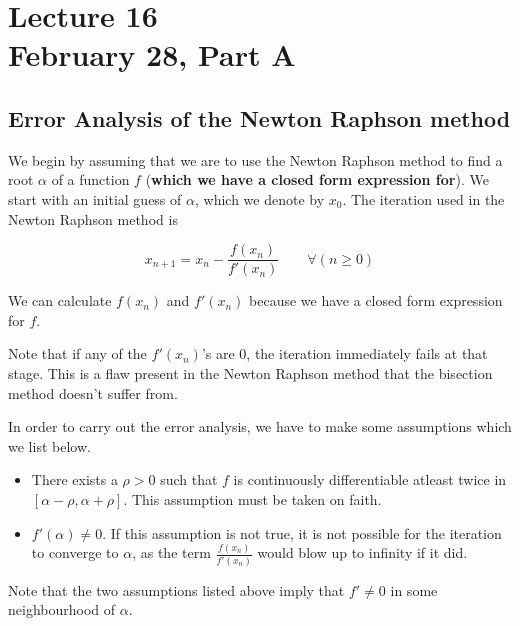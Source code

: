 \chapter*{Lecture 16 \\ February 28, Part A}
\setcounter{chapter}{16}
\setcounter{section}{0}

\section{Error Analysis of the Newton Raphson method}

We begin by assuming that we are to use the Newton Raphson method to find a root $\alpha$ of a function $f$ (\textbf{which we have a closed form expression for}). We start with an initial guess of $\alpha$, which we denote by $x_0$.
The iteration used in the Newton Raphson method is
\begin{defn}
  \label{feb28:def:iter}
  \[
    x_{n+1} = x_n - \frac{f(x_n)}{f'(x_n)} \qquad \forall(n \geq 0)
  \]
\end{defn}
We can calculate $f(x_n)$ and $f'(x_n)$ because we have a closed form expression for $f$.

Note that if any of the $f'(x_n)$'s are 0, the iteration immediately fails at that stage. This is a flaw present in the Newton Raphson method that the bisection method doesn't suffer from.

In order to carry out the error analysis, we have to make some assumptions which we list below.
\begin{itemize}
\item
  There exists a $\rho > 0$ such that $f$ is continuously differentiable atleast twice in $[\alpha - \rho, \alpha + \rho]$. This assumption must be taken on faith.
\item
  $f'(\alpha) \neq 0$. If this assumption is not true, it is not possible for the iteration to converge to $\alpha$, as the term $\frac{f(x_n)}{f'(x_n)}$ would blow up to infinity if it did.
\end{itemize}

Note that the two assumptions listed above imply that $f' \neq 0$ in some neighbourhood of $\alpha$.

